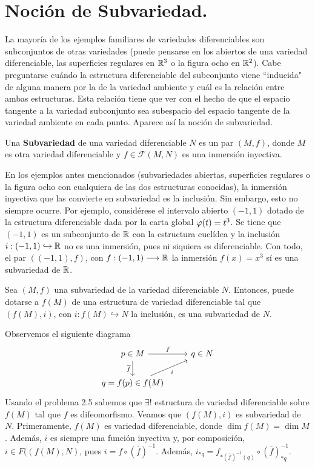 \documentclass[Cursovd_portada.tex]{subfiles}
\begin{document}
\section{Noción de Subvariedad.}
\hs La mayoría de los ejemplos familiares de variedades
diferenciables son subconjuntos de otras variedades (puede
pensarse en los abiertos de una variedad diferenciable, las
superficies re\-gu\-la\-res en $\mathbb{R}^3$ o la figura ocho en $\mathbb{R}^2$).
Cabe preguntarse cuándo la estructura diferenciable del
subconjunto viene ``inducida" de alguna manera por la de la
variedad ambiente y cuál es la relación entre ambas
estructuras. Esta relación tiene que ver con el hecho de que
el espacio tangente a la variedad subconjunto sea subespacio del
espacio tangente de la variedad ambiente en cada punto. Aparece
así la noción de subvariedad.
\begin{defi}
Una {\bf Subvariedad} de una variedad diferenciable $N$ es un par $(M,f)$, donde $M$ es otra variedad
diferenciable y $f\in\mathcal{F}(M,N)$ es una inmersión inyectiva.
\end{defi}
En los ejemplos antes mencionados (subvariedades abiertas,
superficies re\-gu\-la\-res o la figura ocho con cualquiera de las
dos estructuras conocidas), la inmersión inyectiva que las
convierte en subvariedad es la inclusión. Sin embargo, esto no
siempre ocurre. Por ejemplo, considérese el intervalo abierto
$(-1,1)$ dotado de la estructura diferenciable dada por la carta
global $\varphi(t)=t^3$. Se tiene que $(-1,1)$ es un subconjunto de
$\mathbb{R}$ con la estructura euclídea y la inclusión
$i:(-1,1)\hookrightarrow\mathbb{R}$ no es una inmersión, pues ni
siquiera es diferenciable. Con todo, el par $((-1,1),f)$, con
$f:(-1,1)\longrightarrow\mathbb{R}$ la inmersión $f(x)=x^3$ sí es una
subvariedad de $\mathbb{R}$.
\begin{prop}\label{prop}
Sea $(M,f)$ una subvariedad de la variedad diferenciable $N$.
Entonces, puede dotarse a $f(M)$ de una estructura de variedad
diferenciable tal que $(f(M),i)$, con $i:f(M)\hookrightarrow N$ la
inclusión, es una subvariedad de $N$.
\end{prop}
\begin{dem} Observemos el siguiente diagrama
\[
\begin{tikzcd}
p\in M\arrow[r,"f"]\arrow[d,"\overline{f}"'] & q\in N\\
q=f(p)\in f(M)\arrow[ur,"i"'] 
\end{tikzcd}
\]
Usando el problema 2.5 sabemos que $\exists!$ estructura de variedad diferenciable sobre $f(M)$ tal que $f$ es difeomorfismo. Veamos que $(f(M),i)$ es subvariedad de $N$. Primeramente, $f(M)$ es variedad diferenciable, donde $\dim f(M)=\dim M$. Además, $i$ es siempre una función inyectiva y, por composición, $i\in F((f(M),N)$, pues $ i = f \circ (\overline{f})^{-1}$. Además, $i_{\ast q} = f_{\ast (\overline{f})^{-1}(q)}\circ (\overline{f})^{-1}_{\ast q}$.

\end{dem}
\end{document}
